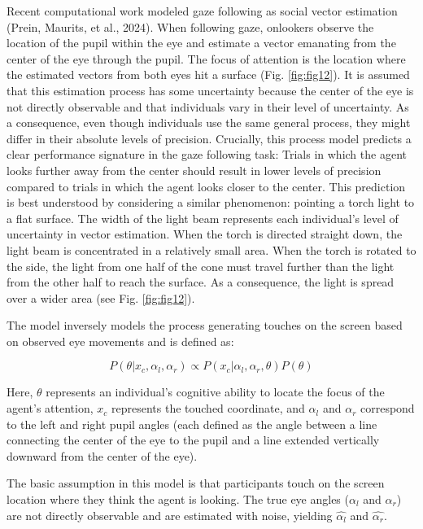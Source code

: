 \documentclass[
  man,floatsintext]{apa7}
\begin{document}
Recent computational work modeled gaze following as social vector estimation (Prein, Maurits, et al., 2024). When following gaze, onlookers observe the location of the pupil within the eye and estimate a vector emanating from the center of the eye through the pupil. The focus of attention is the location where the estimated vectors from both eyes hit a surface (Fig. \ref{fig:fig12}). It is assumed that this estimation process has some uncertainty because the center of the eye is not directly observable and that individuals vary in their level of uncertainty. As a consequence, even though individuals use the same general process, they might differ in their absolute levels of precision. Crucially, this process model predicts a clear performance signature in the gaze following task: Trials in which the agent looks further away from the center should result in lower levels of precision compared to trials in which the agent looks closer to the center. This prediction is best understood by considering a similar phenomenon: pointing a torch light to a flat surface. The width of the light beam represents each individual's level of uncertainty in vector estimation. When the torch is directed straight down, the light beam is concentrated in a relatively small area. When the torch is rotated to the side, the light from one half of the cone must travel further than the light from the other half to reach the surface. As a consequence, the light is spread over a wider area (see Fig. \ref{fig:fig12}).

The model inversely models the process generating touches on the screen based on observed eye movements and is defined as:

\begin{equation}
    P(\theta | x_c, \alpha_l, \alpha_r) \propto P(x_c | \alpha_l, \alpha_r, \theta)P(\theta)
\end{equation}

Here, \(\theta\) represents an individual's cognitive ability to locate the focus of the agent's attention, \(x_c\) represents the touched coordinate, and \(\alpha_l\) and \(\alpha_r\) correspond to the left and right pupil angles (each defined as the angle between a line connecting the center of the eye to the pupil and a line extended vertically downward from the center of the eye).

The basic assumption in this model is that participants touch on the screen location where they think the agent is looking. The true eye angles (\(\alpha_l\) and \(\alpha_r\)) are not directly observable and are estimated with noise, yielding \(\hat{\alpha_l}\) and \(\hat{\alpha_r}\).
\end{document}
